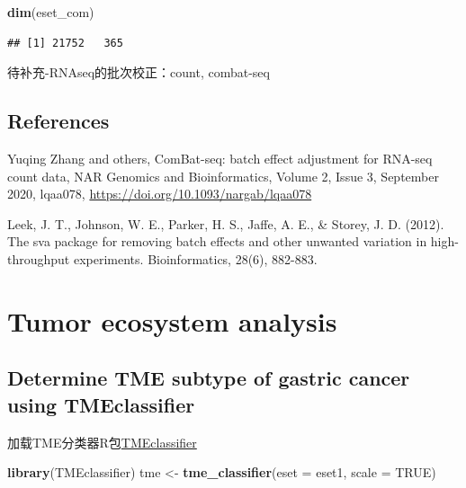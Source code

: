 \documentclass[
  12pt,
]{book}
\newenvironment{Shaded}{\begin{snugshade}}{\end{snugshade}}
\newcommand{\AttributeTok}[1]{\textcolor[rgb]{0.13,0.29,0.53}{#1}}
\newcommand{\ConstantTok}[1]{\textcolor[rgb]{0.56,0.35,0.01}{#1}}
\newcommand{\FunctionTok}[1]{\textcolor[rgb]{0.13,0.29,0.53}{\textbf{#1}}}
\newcommand{\NormalTok}[1]{#1}
\newcommand{\OtherTok}[1]{\textcolor[rgb]{0.56,0.35,0.01}{#1}}
\theoremstyle{definition}
\theoremstyle{definition}
\theoremstyle{definition}
\theoremstyle{definition}
\theoremstyle{remark}
\begin{document}
\begin{Shaded}
\begin{Highlighting}[]
\FunctionTok{dim}\NormalTok{(eset\_com)}
\end{Highlighting}
\end{Shaded}

\begin{verbatim}
## [1] 21752   365
\end{verbatim}

待补充-RNAseq的批次校正：count, combat-seq

\hypertarget{references}{%
\section{References}\label{references}}

Yuqing Zhang and others, ComBat-seq: batch effect adjustment for RNA-seq count data, NAR Genomics and Bioinformatics, Volume 2, Issue 3, September 2020, lqaa078, \url{https://doi.org/10.1093/nargab/lqaa078}

Leek, J. T., Johnson, W. E., Parker, H. S., Jaffe, A. E., \& Storey, J. D. (2012). The sva package for removing batch effects and other unwanted variation in high-throughput experiments. Bioinformatics, 28(6), 882-883.

\hypertarget{tumor-ecosystem-analysis}{%
\chapter{\texorpdfstring{\textbf{Tumor ecosystem analysis}}{Tumor ecosystem analysis}}\label{tumor-ecosystem-analysis}}

\hypertarget{determine-tme-subtype-of-gastric-cancer-using-tmeclassifier}{%
\section{Determine TME subtype of gastric cancer using TMEclassifier}\label{determine-tme-subtype-of-gastric-cancer-using-tmeclassifier}}

加载TME分类器R包\href{https://github.com/LiaoWJLab/TMEclassifier}{TMEclassifier}

\begin{Shaded}
\begin{Highlighting}[]
\FunctionTok{library}\NormalTok{(TMEclassifier)}
\NormalTok{tme }\OtherTok{\textless{}{-}} \FunctionTok{tme\_classifier}\NormalTok{(}\AttributeTok{eset =}\NormalTok{ eset1, }\AttributeTok{scale =} \ConstantTok{TRUE}\NormalTok{)}
\end{Highlighting}
\end{Shaded}
\end{document}
